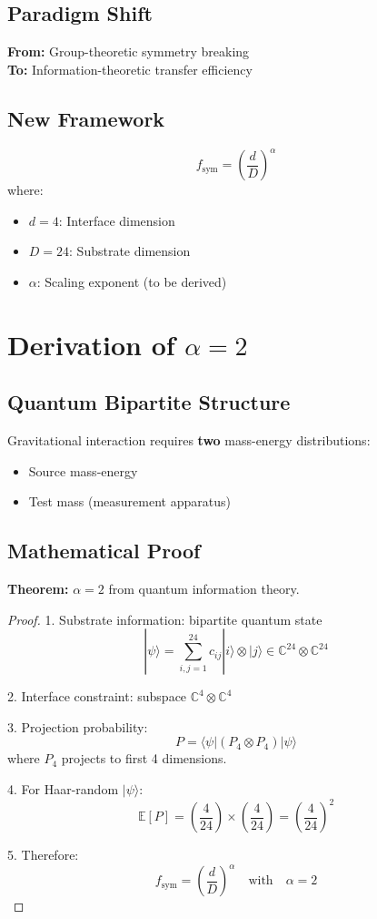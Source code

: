 \documentclass[12pt]{article}
\begin{document}
\subsection{Paradigm Shift}
\begin{tcolorbox}[colback=blue!5!white,colframe=blue!75!black]
\textbf{From:} Group-theoretic symmetry breaking\\
\textbf{To:} Information-theoretic transfer efficiency
\end{tcolorbox}

\subsection{New Framework}
\[
f_{\text{sym}} = \left(\frac{d}{D}\right)^\alpha
\]
where:
\begin{itemize}
\item $d=4$: Interface dimension
\item $D=24$: Substrate dimension  
\item $\alpha$: Scaling exponent (to be derived)
\end{itemize}

\section{Derivation of $\alpha=2$}

\subsection{Quantum Bipartite Structure}

Gravitational interaction requires \textbf{two} mass-energy distributions:
\begin{itemize}
\item Source mass-energy
\item Test mass (measurement apparatus)
\end{itemize}

\subsection{Mathematical Proof}

\textbf{Theorem:} $\alpha = 2$ from quantum information theory.

\begin{proof}
1. Substrate information: bipartite quantum state
\[
|\psi\rangle = \sum_{i,j=1}^{24} c_{ij} |i\rangle \otimes |j\rangle \in \mathbb{C}^{24} \otimes \mathbb{C}^{24}
\]

2. Interface constraint: subspace $\mathbb{C}^4 \otimes \mathbb{C}^4$

3. Projection probability:
\[
P = \langle \psi | (P_4 \otimes P_4) | \psi \rangle
\]
where $P_4$ projects to first 4 dimensions.

4. For Haar-random $|\psi\rangle$:
\[
\mathbb{E}[P] = \left(\frac{4}{24}\right) \times \left(\frac{4}{24}\right) = \left(\frac{4}{24}\right)^2
\]

5. Therefore:
\[
f_{\text{sym}} = \left(\frac{d}{D}\right)^\alpha \quad \text{with} \quad \alpha = 2
\]
\end{proof}
\end{document}
